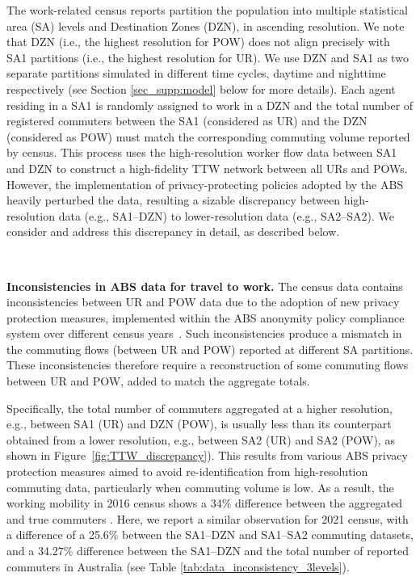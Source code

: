 \documentclass{article}
\begin{document}
\begin{appendices}
The work-related census reports  partition the population into multiple statistical area (SA) levels and Destination Zones (DZN), in ascending resolution. We note that DZN (i.e., the highest resolution for POW) does not align precisely with SA1 partitions (i.e., the highest resolution for UR). We use DZN and SA1 as two separate partitions simulated in different time cycles, daytime and nighttime respectively (see Section \ref{sec_supp:model} below for more details). Each agent residing in a SA1 is randomly assigned to work in a DZN and the total number of registered commuters between the SA1 (considered as UR) and the DZN (considered as POW) must match the corresponding commuting volume reported by census. This process uses the high-resolution worker flow data between SA1 and DZN to construct a high-fidelity TTW network between all URs and POWs. 
However, the implementation of privacy-protecting policies adopted by the ABS heavily perturbed the data, resulting a sizable discrepancy between high-resolution data (e.g., SA1--DZN) to lower-resolution data (e.g., SA2--SA2). We consider and address this discrepancy in detail, as described below. 

\

\textbf{Inconsistencies in ABS data for travel to work.}
The census data contains inconsistencies between UR and POW data due to the adoption of new privacy protection measures, implemented within the ABS anonymity policy compliance system over different census years~\cite{ABS_data_confidentiality_guide, fair_creating_2019}. Such inconsistencies produce a mismatch in the commuting flows (between UR and POW) reported at different SA partitions. These inconsistencies therefore require a reconstruction of some commuting flows between UR and POW, added to match the aggregate totals. 

Specifically, the total number of commuters aggregated at a higher resolution, e.g., between SA1 (UR) and DZN (POW), is usually less than its counterpart obtained from a lower resolution, e.g., between SA2 (UR) and SA2 (POW), as shown in Figure~\ref{fig:TTW_discrepancy}). This results from  various ABS privacy protection measures aimed to avoid re-identification from high-resolution commuting data, particularly when commuting volume is low. As a result, the working mobility in 2016 census shows a 34\%  difference between the aggregated and true commuters \cite{fair_creating_2019}. Here, we report a similar observation for 2021 census, with a difference of a 25.6\% between the SA1--DZN and SA1--SA2 commuting datasets, and a 34.27\% difference between the SA1--DZN and the total number of reported commuters in  Australia (see Table \ref{tab:data_inconsistency_3levels}).


\end{appendices}
\end{document}
